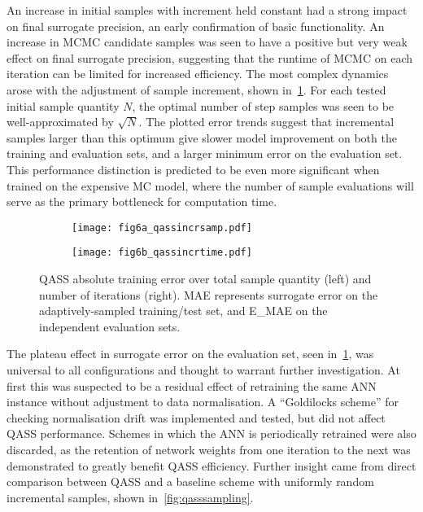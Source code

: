 An increase in initial samples with increment held constant had a strong impact
on final surrogate precision, an early confirmation of basic functionality. An
increase in MCMC candidate samples was seen to have a positive but very weak
effect on final surrogate precision, suggesting that the runtime of MCMC on each
iteration can be limited for increased efficiency. The most complex dynamics
arose with the adjustment of sample increment, shown in~\cref{fig:qassincr}. For
each tested initial sample quantity $N$, the optimal number of step samples was seen to be well-approximated by $\sqrt{N}$. The plotted error trends suggest that
incremental samples larger than this optimum give slower model improvement on both the training and evaluation sets, and a larger minimum error on the evaluation set. This performance distinction is predicted to be even more significant when trained on the expensive MC model, where the number of sample evaluations will serve as the primary bottleneck for computation time.
\begin{figure}[h!]
    \centering
    \vspace{-1ex}
    \begin{subfigure}[t]{0.5\textwidth}
        \centering
        \texttt{[image: fig6a\_qassincrsamp.pdf]}
    \end{subfigure}%
    \hfill%
    \begin{subfigure}[t]{0.5\textwidth}
        \centering
        \texttt{[image: fig6b\_qassincrtime.pdf]}
    \end{subfigure}
    \caption{QASS absolute training error over total sample quantity (left) and number of iterations (right). MAE represents surrogate error on the adaptively-sampled training/test set, and E\_MAE on the independent evaluation sets.}
    \label{fig:qassincr}
    \vspace{-1ex}
\end{figure}

The plateau effect in surrogate error on the evaluation set, seen
in~\cref{fig:qassincr}, was universal to all configurations and thought to
warrant further investigation. At first this was suspected to be a residual
effect of retraining the same ANN instance without adjustment to data
normalisation. A ``Goldilocks scheme'' for checking normalisation drift was
implemented and tested, but did not affect QASS performance. Schemes in which
the ANN is periodically retrained were also discarded, as the retention of
network weights from one iteration to the next was demonstrated to greatly
benefit QASS efficiency. Further insight came from direct comparison between
QASS and a baseline scheme with uniformly random incremental samples, shown
in~\cref{fig:qasssampling}.

